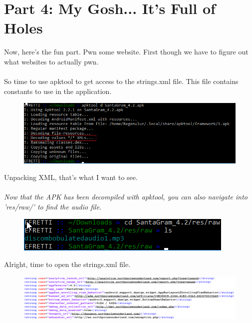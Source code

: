 \documentclass[writeup.tex]{subfiles}
\begin{document}
			
\section{Part 4: My Gosh... It's Full of Holes} \label{section.part4}
	Now, here's the fun part. Pwn some website. First though we have to figure out what websites to actually pwn.\\
	\\
	So time to use apktool to get access to the strings.xml file. This file contains constants to use in the application.
	
	\begin{figure}[H]
		\centering
		\includegraphics[width=\linewidth]{"screenshots/apktool_decompile"}
	\end{figure}
	
	Unpacking XML, that's what I want to see.\\
	\\
	\textit{Now that the APK has been decompiled with apktool, you can also navigate into 'res/raw/' to find the audio file.}
	\begin{figure}[H]
		\centering
		\includegraphics[width=\linewidth]{"screenshots/apktool_mp3"}
	\end{figure}
	
	Alright, time to open the strings.xml file.
	
	\begin{figure}[H]
		\centering
		\includegraphics[width=\linewidth]{"screenshots/strings xml"}
	\end{figure}
	
\end{document}

